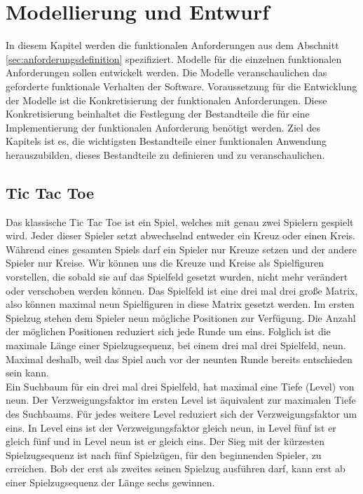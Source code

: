 \chapter{Modellierung und Entwurf}
\label{cha:Modellierung und Entwurf}

In diesem Kapitel werden die funktionalen Anforderungen aus dem Abschnitt \ref{sec:anforderungsdefinition} spezifiziert. Modelle für die einzelnen funktionalen Anforderungen sollen entwickelt werden. Die Modelle veranschaulichen das geforderte funktionale Verhalten der Software. Voraussetzung für die Entwicklung der Modelle ist die Konkretisierung der funktionalen Anforderungen. Diese Konkretisierung beinhaltet die Festlegung der Bestandteile die für eine Implementierung der funktionalen Anforderung benötigt werden. Ziel des Kapitels ist es, die wichtigsten Bestandteile einer funktionalen Anwendung herauszubilden, dieses Bestandteile zu definieren und zu veranschaulichen. 

\section{Tic Tac Toe}
\label{sec:Tic Tac Toe}

Das klassische Tic Tac Toe ist ein Spiel, welches mit genau zwei Spielern gespielt wird. Jeder dieser Spieler setzt abwechselnd entweder ein Kreuz oder einen Kreis. Während eines gesamten Spiels darf ein Spieler nur Kreuze setzen und der andere Spieler nur Kreise. Wir können uns die Kreuze und Kreise als Spielfiguren vorstellen, die sobald sie auf das Spielfeld gesetzt wurden, nicht mehr verändert oder verschoben werden können. Das Spielfeld ist eine drei mal drei große Matrix, also können maximal neun Spielfiguren in diese Matrix gesetzt werden. Im ersten Spielzug stehen dem Spieler neun mögliche Positionen zur Verfügung. Die Anzahl der möglichen Positionen reduziert sich jede Runde um eins. Folglich ist die maximale Länge einer Spielzugsequenz, bei einem drei mal drei Spielfeld, neun. Maximal deshalb, weil das Spiel auch vor der neunten Runde bereits entschieden sein kann. \\

Ein Suchbaum für ein drei mal drei Spielfeld, hat maximal eine Tiefe (Level) von neun. Der Verzweigungsfaktor im ersten Level ist äquivalent zur maximalen Tiefe des Suchbaums. Für jedes weitere Level reduziert sich der Verzweigungsfaktor um eins. In Level eins ist der Verzweigungsfaktor gleich neun, in Level fünf ist er gleich fünf und in Level neun ist er gleich  eins. Der Sieg mit der kürzesten Spielzugsequenz ist nach fünf Spielzügen, für den beginnenden Spieler, zu erreichen. Bob der erst als zweites seinen Spielzug ausführen darf, kann erst ab einer Spielzugsequenz der Länge sechs gewinnen. 

